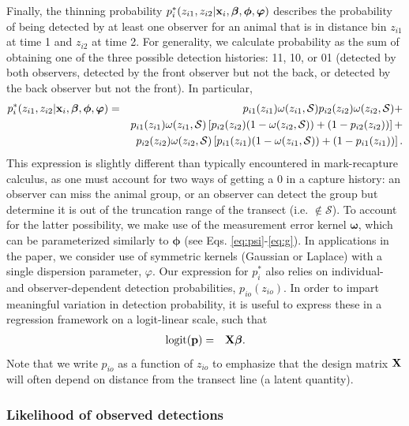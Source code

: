 \documentclass[12pt,fleqn]{article}
\begin{document}
Finally, the thinning probability
$p_i^*(z_{i1},z_{i2}|{\bf x}_i,\boldsymbol{\beta},\boldsymbol{\phi},\boldsymbol{\varphi})$ describes the probability of being detected by at least one observer for an animal that is in distance bin $z_{i1}$ at time 1 and $z_{i2}$ at time 2. For generality, we calculate probability as the sum of obtaining one of the three possible detection histories: 11, 10, or 01 (detected by both observers, detected by the front observer but not the back, or detected by the back observer but not the front).  In particular,
\begin{eqnarray*}
  \label{eq:pstar}
  p_i^*(z_{i1},z_{i2}|{\bf x}_i,\boldsymbol{\beta},\boldsymbol{\phi},\boldsymbol{\varphi}) & = &
  p_{i1}(z_{i1}) \omega(z_{i1},\mathcal{S}) p_{i2}(z_{i2})
  \omega(z_{i2},\mathcal{S}) + \\
   & & p_{i1}(z_{i1})\omega(z_{i1},\mathcal{S}) \left[
   p_{i2}(z_{i2})(1-\omega(z_{i2},\mathcal{S}))+(1-p_{i2}(z_{i2})) \right] + \nonumber \\
   & & p_{i2}(z_{i2})\omega(z_{i2},\mathcal{S}) \left[
   p_{i1}(z_{i1})(1-\omega(z_{i1},\mathcal{S}))+(1-p_{i1}(z_{i1})) \right]. \nonumber
\end{eqnarray*}
This expression is slightly different than typically encountered in mark-recapture calculus, as one must account for two ways of getting a 0 in a capture history: an observer can miss the animal group, or an observer can detect the group but determine it is out of the truncation range of the transect (i.e. $\notin \mathcal{S}$).  To account for the latter possibility, we make use of the measurement error kernel $\boldsymbol{\omega}$, which can be parameterized similarly to $\boldsymbol{\phi}$ (see Eqs. \ref{eq:psi}-\ref{eq:g}).  In applications in the paper, we consider use of symmetric kernels (Gaussian or Laplace) with a single dispersion parameter, $\varphi$.  Our expression for $p_i^*$ also relies on individual- and observer-dependent detection probabilities, $p_{io}(z_{io})$.  In order to impart meaningful variation in detection probability, it is useful to express these in a regression framework on a logit-linear scale, such that
\begin{eqnarray}
  \textrm{logit}({\bf p}) & = & {\bf X} \boldsymbol{\beta}.
  \label{eq:p}
\end{eqnarray}
Note that we write $p_{io}$ as a function of $z_{io}$ to emphasize that the design matrix ${\bf X}$ will often depend on distance from the transect line (a latent quantity).

\subsubsection{Likelihood of observed detections}
\end{document}
